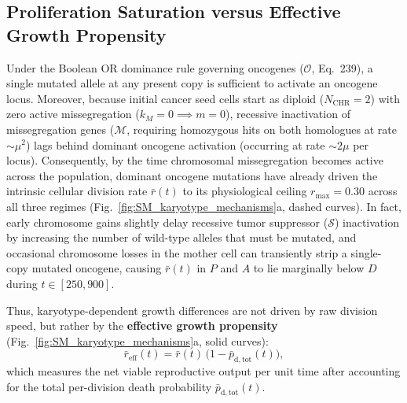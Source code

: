 \documentclass[11pt,a4paper]{article}
\begin{document}
\subsection{Proliferation Saturation versus Effective Growth Propensity}
Under the Boolean OR dominance rule governing oncogenes ($\mathcal{O}$, Eq.~239), a single mutated allele at any present copy is sufficient to activate an oncogene locus. Moreover, because initial cancer seed cells start as diploid ($N_{\text{CHR}} = 2$) with zero active missegregation ($k_M = 0 \implies m = 0$), recessive inactivation of missegregation genes ($\mathcal{M}$, requiring homozygous hits on both homologues at rate $\sim \mu^2$) lags behind dominant oncogene activation (occurring at rate $\sim 2\mu$ per locus). Consequently, by the time chromosomal missegregation becomes active across the population, dominant oncogene mutations have already driven the intrinsic cellular division rate $\bar{r}(t)$ to its physiological ceiling $r_{\max} = 0.30$ across all three regimes (Fig.~\ref{fig:SM_karyotype_mechanisms}a, dashed curves). In fact, early chromosome gains slightly delay recessive tumor suppressor ($\mathcal{S}$) inactivation by increasing the number of wild-type alleles that must be mutated, and occasional chromosome losses in the mother cell can transiently strip a single-copy mutated oncogene, causing $\bar{r}(t)$ in $P$ and $A$ to lie marginally below $D$ during $t \in [250, 900]$.

Thus, karyotype-dependent growth differences are not driven by raw division speed, but rather by the \textbf{effective growth propensity} (Fig.~\ref{fig:SM_karyotype_mechanisms}a, solid curves):
\begin{equation}
    \bar{r}_{\mathrm{eff}}(t) = \bar{r}(t)\,\bigl(1 - \bar{p}_{\mathrm{d},\mathrm{tot}}(t)\bigr),
\end{equation}
which measures the net viable reproductive output per unit time after accounting for the total per-division death probability $\bar{p}_{\mathrm{d},\mathrm{tot}}(t)$.
\end{document}
